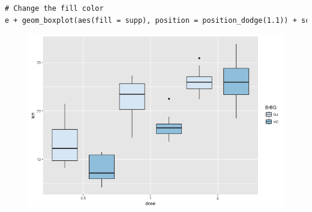 \begin{lstlisting}[language=html]
# Change the fill color
e + geom_boxplot(aes(fill = supp), position = position_dodge(1.1)) + scale_fill_brewer("BrBG")
\end{lstlisting}
\begin{figure}[H]\begin{center}\includegraphics[scale=1 ]{ilu/bg88.png}\end{center}\end{figure}


